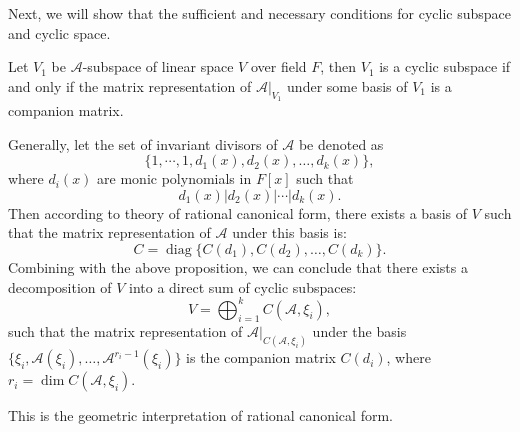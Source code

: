 \documentclass[11pt]{../../TexTemplate/elegantbook} %
\begin{document}
\vspace{0.7cm}
Next, we will show that the sufficient and necessary conditions for cyclic subspace and cyclic space.
\begin{proposition}
    Let \(V_{1}\) be \(\mathcal{A}\)-subspace of linear space \(V\) over field \(F\),
    then \(V_{1}\) is a cyclic subspace if and only if
    the matrix representation of \(\mathcal{A}|_{V_{1}}\) under some basis of \(V_{1}\) is a companion matrix.
\end{proposition}

Generally, let the set of invariant divisors of \(\mathcal{A}\) be denoted as
\[
\{ 1, \cdots, 1, d_{1}(x), d_{2}(x), \ldots, d_{k}(x) \},
\]
where \( d_{i}(x) \) are monic polynomials in \( F[x] \) such that
\[
d_{1}(x) | d_{2}(x) | \cdots | d_{k}(x).
\]
Then according to theory of rational canonical form,
there exists a basis of \( V \) such that the matrix representation of \( \mathcal{A} \) under this basis is:
\[
C=\operatorname{diag}\{ C(d_{1}), C(d_{2}), \ldots, C(d_{k}) \}.
\]
Combining with the above proposition,
we can conclude that there exists a decomposition of \( V \) into a direct sum of cyclic subspaces:
\[
V = \bigoplus_{i=1}^{k} C(\mathcal{A}, \xi_{i}),
\]
such that the matrix representation of \( \mathcal{A}|_{C(\mathcal{A}, \xi_{i})} \)
under the basis \( \{ \xi_{i}, \mathcal{A}(\xi_{i}), \ldots, \mathcal{A}^{r_{i}-1}(\xi_{i}) \} \)
is the companion matrix \( C(d_{i}) \),
where \( r_{i} = \operatorname{dim} C(\mathcal{A}, \xi_{i}) \).

This is the geometric interpretation of rational canonical form.
\end{document}
